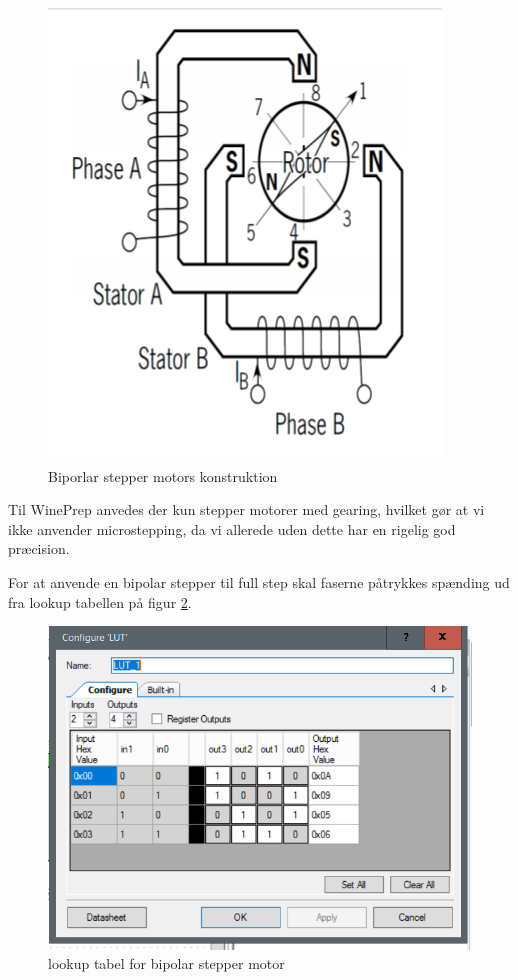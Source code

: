 \begin{figure}[H]
	\centering
	\includegraphics{Billeder/konstruktion}
	\caption{Biporlar stepper motors konstruktion}
	\label{bipolarlayout}
\end{figure}

Til WinePrep anvedes der kun stepper motorer med gearing, hvilket gør at vi ikke anvender microstepping, da vi allerede uden dette har en rigelig god præcision.

For at anvende en bipolar stepper til full step skal faserne påtrykkes spænding ud fra lookup tabellen på figur \ref{lookuptabel}.

\begin{figure}[H]
	\centering
	\includegraphics{Billeder/lookup}
	\caption{lookup tabel for bipolar stepper motor}
	\label{lookuptabel}
\end{figure}

